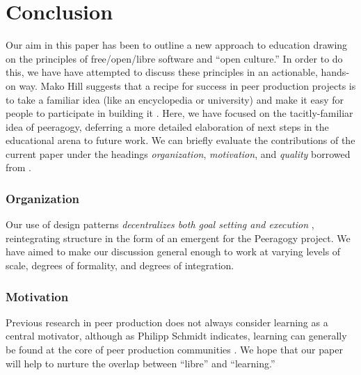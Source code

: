 \section{Conclusion}\label{sec:Conclusion}


Our aim in this paper has been to outline a new approach to education
drawing on the principles of free/open/libre software and ``open
culture.''  In order to do this, we have have attempted to discuss
these principles in an actionable, hands-on way.  Mako Hill suggests
that a recipe for success in peer production projects is to take a
familiar idea (like an encyclopedia or university) and make it easy
for people to participate in building it \cite{almost-wikipedia}.
Here, we have focused on the tacitly-familiar idea of peeragogy, deferring a
more detailed elaboration of next steps in the educational arena to
future work.  We can briefly evaluate the contributions of the current
paper under the headings \emph{organization}, \emph{motivation}, and
\emph{quality} borrowed from \cite{benkler2015peer}.

\vspace{-.25\baselineskip}

\subsubsection*{Organization} 
Our use of design patterns \emph{decentralizes both goal setting and
  execution} \cite{benkler2015peer}, reintegrating structure in the
form of an emergent  for the Peeragogy project.
We have aimed to make our discussion general enough to work at varying
levels of scale, degrees of formality, and degrees of integration.

\vspace{-.25\baselineskip}

\subsubsection*{Motivation}  Previous research in peer production does not always consider learning as
a central motivator, although as Philipp Schmidt indicates, learning can generally be found at the core of peer production communities \cite{schmidt+commons-based+2009}.  We hope that our paper will help to nurture the overlap between ``libre'' and ``learning.''

